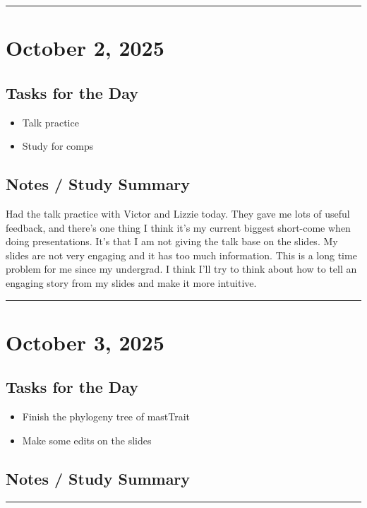 \documentclass[12pt]{article}
\begin{document}
\vspace{1em}
\hrule
\vspace{1em}

\section*{October 2, 2025}

\subsection*{Tasks for the Day}
\begin{itemize}
    \item Talk practice
    \item Study for comps
\end{itemize}
\subsection*{Notes / Study Summary}
Had the talk practice with Victor and Lizzie today. They gave me lots of useful feedback, and there's one thing I think it's my current biggest short-come when doing presentations. It's that I am not giving the talk base on the slides. My slides are not very engaging and it has too much information. This is a long time problem for me since my undergrad. I think I'll try to think about how to tell an engaging story from my slides and make it more intuitive.

\vspace{1em}
\hrule
\vspace{1em}

\section*{October 3, 2025}

\subsection*{Tasks for the Day}
\begin{itemize}
    \item Finish the phylogeny tree of mastTrait
    \item Make some edits on the slides
\end{itemize}
\subsection*{Notes / Study Summary}


\vspace{1em}
\hrule
\vspace{1em}
\end{document}
